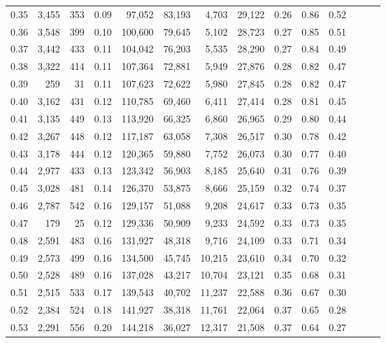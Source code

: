 \begin{tabular}{rrrrrrrrrrrrrr}
0.35 &  3,455 &    353 &  0.09 &   97,052 &   83,193 &   4,703 &  29,122 &  0.26 &  0.86 &      0.52 \\
0.36 &  3,548 &    399 &  0.10 &  100,600 &   79,645 &   5,102 &  28,723 &  0.27 &  0.85 &      0.51 \\
0.37 &  3,442 &    433 &  0.11 &  104,042 &   76,203 &   5,535 &  28,290 &  0.27 &  0.84 &      0.49 \\
0.38 &  3,322 &    414 &  0.11 &  107,364 &   72,881 &   5,949 &  27,876 &  0.28 &  0.82 &      0.47 \\
0.39 &    259 &     31 &  0.11 &  107,623 &   72,622 &   5,980 &  27,845 &  0.28 &  0.82 &      0.47 \\
0.40 &  3,162 &    431 &  0.12 &  110,785 &   69,460 &   6,411 &  27,414 &  0.28 &  0.81 &      0.45 \\
0.41 &  3,135 &    449 &  0.13 &  113,920 &   66,325 &   6,860 &  26,965 &  0.29 &  0.80 &      0.44 \\
0.42 &  3,267 &    448 &  0.12 &  117,187 &   63,058 &   7,308 &  26,517 &  0.30 &  0.78 &      0.42 \\
0.43 &  3,178 &    444 &  0.12 &  120,365 &   59,880 &   7,752 &  26,073 &  0.30 &  0.77 &      0.40 \\
0.44 &  2,977 &    433 &  0.13 &  123,342 &   56,903 &   8,185 &  25,640 &  0.31 &  0.76 &      0.39 \\
0.45 &  3,028 &    481 &  0.14 &  126,370 &   53,875 &   8,666 &  25,159 &  0.32 &  0.74 &      0.37 \\
0.46 &  2,787 &    542 &  0.16 &  129,157 &   51,088 &   9,208 &  24,617 &  0.33 &  0.73 &      0.35 \\
0.47 &    179 &     25 &  0.12 &  129,336 &   50,909 &   9,233 &  24,592 &  0.33 &  0.73 &      0.35 \\
0.48 &  2,591 &    483 &  0.16 &  131,927 &   48,318 &   9,716 &  24,109 &  0.33 &  0.71 &      0.34 \\
0.49 &  2,573 &    499 &  0.16 &  134,500 &   45,745 &  10,215 &  23,610 &  0.34 &  0.70 &      0.32 \\
0.50 &  2,528 &    489 &  0.16 &  137,028 &   43,217 &  10,704 &  23,121 &  0.35 &  0.68 &      0.31 \\
0.51 &  2,515 &    533 &  0.17 &  139,543 &   40,702 &  11,237 &  22,588 &  0.36 &  0.67 &      0.30 \\
0.52 &  2,384 &    524 &  0.18 &  141,927 &   38,318 &  11,761 &  22,064 &  0.37 &  0.65 &      0.28 \\
0.53 &  2,291 &    556 &  0.20 &  144,218 &   36,027 &  12,317 &  21,508 &  0.37 &  0.64 &      0.27 \\

\end{tabular}
